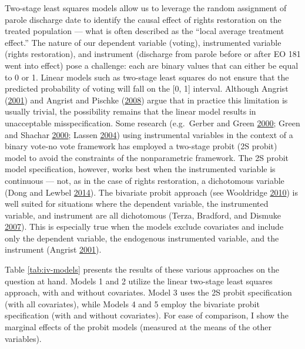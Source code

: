 \documentclass[12pt,]{article}
\begin{document}
Two-stage least squares models allow us to leverage the random assignment of parole discharge date to identify the causal effect of rights restoration on the treated population --- what is often described as the ``local average treatment effect.'' The nature of our dependent variable (voting), instrumented variable (rights restoration), and instrument (discharge from parole before or after EO 181 went into effect) pose a challenge: each are binary values that can either be equal to 0 or 1. Linear models such as two-stage least squares do not ensure that the predicted probability of voting will fall on the {[}0, 1{]} interval. Although Angrist (\protect\hyperlink{ref-Angrist2001}{2001}) and Angrist and Pischke (\protect\hyperlink{ref-Angrist2008}{2008}) argue that in practice this limitation is usually trivial, the possibility remains that the linear model results in unacceptable misspecification. Some research (e.g.~Gerber and Green \protect\hyperlink{ref-Gerber2000}{2000}; Green and Shachar \protect\hyperlink{ref-Green2000}{2000}; Lassen \protect\hyperlink{ref-Lassen2004}{2004}) using instrumental variables in the context of a binary vote-no vote framework has employed a two-stage probit (2S probit) model to avoid the constraints of the nonparametric framework. The 2S probit model specification, however, works best when the instrumented variable is continuous --- not, as in the case of rights restoration, a dichotomous variable (Dong and Lewbel \protect\hyperlink{ref-Dong2014}{2014}). The bivariate probit approach (see Wooldridge \protect\hyperlink{ref-Wooldridge2010}{2010}) is well suited for situations where the dependent variable, the instrumented variable, and instrument are all dichotomous (Terza, Bradford, and Dismuke \protect\hyperlink{ref-Terza2007}{2007}). This is especially true when the models exclude covariates and include only the dependent variable, the endogenous instrumented variable, and the instrument (Angrist \protect\hyperlink{ref-Angrist2001}{2001}).

Table \ref{tab:iv-models} presents the results of these various approaches on the question at hand. Models 1 and 2 utilize the linear two-stage least squares approach, with and without covariates. Model 3 uses the 2S probit specification (with all covariates), while Models 4 and 5 employ the bivariate probit specification (with and without covariates). For ease of comparison, I show the marginal effects of the probit models (measured at the means of the other variables).


\end{document}

